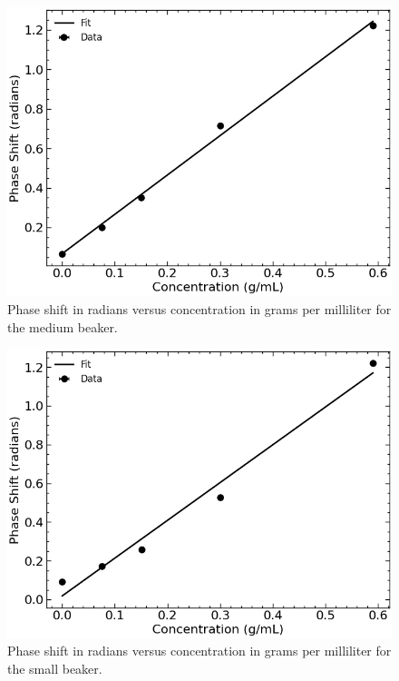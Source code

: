\begin{figure}[H]
    \begin{center}
        \includegraphics[width=\columnwidth]{../figures/medium_beaker_phase_shifts.png}
    \end{center}
    \caption{Phase shift in radians versus concentration in grams per milliliter for the medium beaker.}
    \label{fig:medium_beaker_phase_shifts}
\end{figure}

\begin{figure}[H]
    \begin{center}
        \includegraphics[width=\columnwidth]{../figures/small_beaker_phase_shifts.png}
    \end{center}
    \caption{Phase shift in radians versus concentration in grams per milliliter for the small beaker.}
    \label{fig:small_beaker_phase_shifts}
\end{figure}

